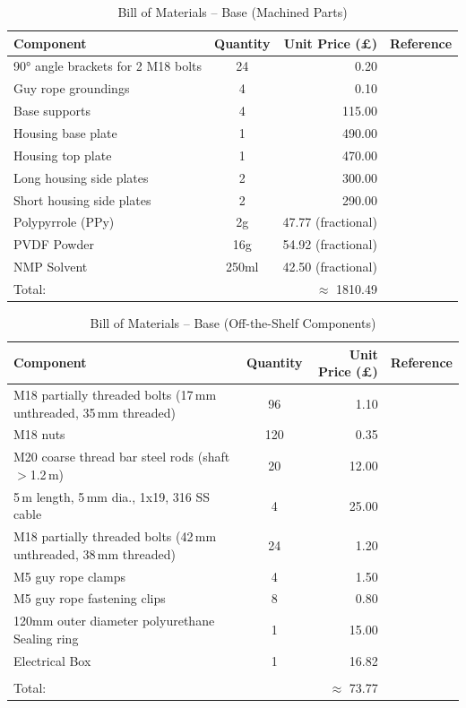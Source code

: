 \documentclass[11pt,a4paper]{article}
\begin{document}
\begin{table}[H]
\centering
\caption{Bill of Materials -- Base (Machined Parts)}
\label{tab:bom_base_machined}
\begin{tabular}{lcrc}
\toprule
Component & Quantity & Unit Price (£) & Reference\\
\midrule
90° angle brackets for 2 M18 bolts & 24 & 0.20 & \cite{Carbon Steel}\\
Guy rope groundings & 4 & 0.10 & \cite{Carbon Steel}\\
Base supports & 4 & 115.00 & \cite{Carbon Steel}\\
Housing base plate & 1 & 490.00 & \cite{Carbon Steel}\\
Housing top plate & 1 & 470.00 & \cite{Carbon Steel}\\
Long housing side plates & 2 & 300.00 & \cite{Carbon Steel}\\
Short housing side plates & 2 & 290.00 & \cite{Carbon Steel}\\
Polypyrrole (PPy) & 2g & 47.77 (fractional) & \cite{PPy}\\
PVDF Powder & 16g & 54.92 (fractional) & \cite{PVDF Powder}\\
NMP Solvent & 250ml & 42.50 (fractional) & \cite{NMP Solvent}\\
\midrule
Total: &  & $\approx$ 1810.49 \\
\bottomrule
\end{tabular}
\end{table}


\begin{table}[H]
\centering
\caption{Bill of Materials -- Base (Off-the-Shelf Components)}
\label{tab:bom_base_ots}
\begin{tabular}{lcrc}
\toprule
Component & Quantity & Unit Price (£) & Reference\\
\midrule
M18 partially threaded bolts (17\,mm unthreaded, 35\,mm threaded) & 96 & 1.10 & \cite{fasteners}\\
M18 nuts & 120 & 0.35 & \cite{fasteners}\\
M20 coarse thread bar steel rods (shaft $>$1.2\,m) & 20 & 12.00 & \cite{fasteners}\\
5\,m length, 5\,mm dia., 1x19, 316 SS cable & 4 & 25.00 & \cite{Cables}\\
M18 partially threaded bolts (42\,mm unthreaded, 38\,mm threaded) & 24 & 1.20 & \cite{fasteners}\\
M5 guy rope clamps & 4 & 1.50 & \cite{Cables}\\
M5 guy rope fastening clips & 8 & 0.80 & \cite{Cables}\\
120mm outer diameter polyurethane Sealing ring & 1 & 15.00 & \cite{Cables}\\
Electrical Box & 1 & 16.82 & \cite{enclosure}\\
\midrule \\
Total: &  & $\approx$ 73.77 \\
\bottomrule
\end{tabular}
\end{table}
\end{document}
